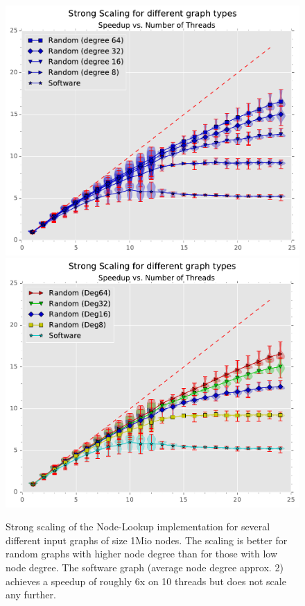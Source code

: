 \begin{figure}[ht]
	\centering
	\includegraphics[width=\columnwidth]{plots/strongscaling_gtALL_n1000000.pdf}
	\includegraphics[width=\columnwidth]{plots/strongscaling_gtALL_n1000000_multicolor.pdf}
	\caption{Strong scaling of the Node-Lookup implementation for several different input graphs of size 1Mio nodes. The scaling is better for random graphs with higher node degree than for those with low node degree.
		The software graph (average node degree approx. 2) achieves a speedup of roughly 6x on 10 threads but does not scale any further.
}
	\label{fig:strongscaling_graphtypes}
\end{figure}
